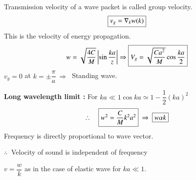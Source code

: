 Transmission velocity of a wave packet is called group velocity.
$$
\fbox{$v_{g}=\nabla_{k}w(k)$}
$$
This is the velocity of energy propagation.
$$
w=\sqrt{\dfrac{4C}{M}}\left|\sin \dfrac{ka}{z}\right|\Rightarrow \fbox{$V_{g}=\sqrt{\dfrac{Ca^{2}}{M}}\cos \dfrac{ka}{2}$}
$$
$v_{g}=0$ at $k=\pm \dfrac{\pi}{a} \ \Rightarrow \ $ Standing wave.

\medskip
\noindent
{\bf Long wavelength limit :} For $ka\ll 1$\quad $\cos ka\simeq 1-\dfrac{1}{2}(ka)^{2}$
$$
\therefore\quad \fbox{$w^{2}=\dfrac{C}{M}k^{2}a^{2}$} \ \Rightarrow \ \fbox{$w\alpha k$}
$$
Frequency is directly proportional to wave vector.

$\therefore \ $ Velocity of sound is independent of frequency 

$v=\dfrac{w}{k}$ as in the case of elastic wave for $ka\ll 1$.

